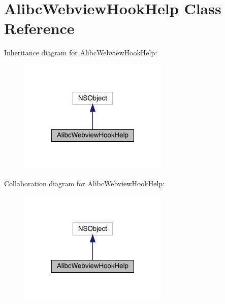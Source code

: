 \hypertarget{interface_alibc_webview_hook_help}{}\section{Alibc\+Webview\+Hook\+Help Class Reference}
\label{interface_alibc_webview_hook_help}


Inheritance diagram for Alibc\+Webview\+Hook\+Help\+:\nopagebreak
\begin{figure}[H]
\begin{center}
\leavevmode
\includegraphics[width=202pt]{interface_alibc_webview_hook_help__inherit__graph}
\end{center}
\end{figure}


Collaboration diagram for Alibc\+Webview\+Hook\+Help\+:\nopagebreak
\begin{figure}[H]
\begin{center}
\leavevmode
\includegraphics[width=202pt]{interface_alibc_webview_hook_help__coll__graph}
\end{center}
\end{figure}
